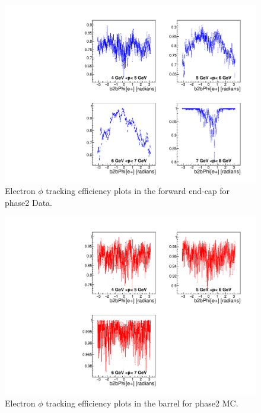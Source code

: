 \documentclass[a4paper,11pt,twosided,final,german,openbib,pdftex,listof=totoc,bibliography=totoc]{scrbook}
\begin{document}
\begin{appendix}
\begin{figure}[!htbp]
	\centering
	\includegraphics[width=\textwidth]{Plots/master/xPMPhiemFC_Data}
	\caption[Momentum $\phi$ Electron Forward End-Cap Efficiency Phase2 Data]{Electron $\phi$ tracking efficiency plots in the forward end-cap for phase2 Data.}
	\label{plt:PMPhiemFC_Data}
\end{figure}














\begin{figure}[!htbp]
	\centering
	\includegraphics[width=\textwidth]{Plots/master/xPMPhiemBarrel_MC}
	\caption[Momentum $\phi$ Electron Barrel Efficiency Phase2 MC]{Electron $\phi$ tracking efficiency plots in the barrel for phase2 MC.}
	\label{plt:PMPhiemBarrel_MC}
\end{figure}



\end{appendix}
\end{document}
